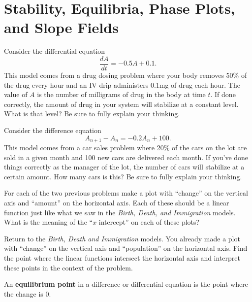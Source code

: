 \newpage\section{Stability, Equilibria, Phase Plots, and Slope Fields}
\begin{problem}
    Consider the differential equation 
    \[ \frac{dA}{dt} = -0.5A + 0.1. \]
    This model comes from a drug dosing problem where your body removes 50\% of the drug
    every hour and an IV drip administers 0.1mg of drug each hour.  The value of $A$ is
    the number of milligrams of drug in the body at time $t$.  If done correctly, the
    amount of drug in your system will stabilize at a constant level.  What is that level?
    Be sure to fully explain your thinking.
\end{problem}

\begin{problem}
    Consider the difference equation
    \[ A_{n+1} - A_n = -0.2 A_n+ 100. \]
    This model comes from a car sales problem where 20\% of the cars on the lot are sold
    in a given month and 100 new cars are delivered each month.  If you've done things
    correctly as the manager of the lot, the number of cars will stabilize at a certain
    amount.  How many cars is this?  Be sure to fully explain your thinking.
\end{problem}

\begin{problem}
    For each of the two previous problems make a plot with ``change'' on the vertical axis
    and ``amount'' on the horizontal axis.  Each of these should be a linear function just
    like what we saw in the {\it Birth, Death, and Immigration} models.  What is the meaning of
    the ``$x$ intercept'' on each of these plots?
\end{problem}

\begin{problem}
    Return to the {\it Birth, Death and Immigration} models.  You already made a plot with
    ``change'' on the vertical axis and ``population'' on the horizontal axis.  Find the
    point where the linear functions intersect the horizontal axis and interpret these
    points in the context of the problem.
\end{problem}

\begin{definition}
    An {\bf equilibrium point} in a difference or differential equation is the point where
    the change is 0.
\end{definition}

